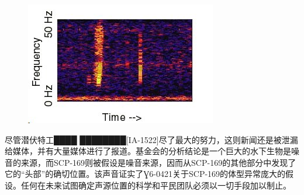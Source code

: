 \begin{figure}[H]
    \centering
    \includegraphics[width=0.5\linewidth]{images/SCP-169.jpg}
\end{figure}

尽管潜伏特工████ ████████{[}IA-1522]尽了最大的努力，这则新闻还是被泄漏给媒体，并有大量媒体进行了报道。基金会的分析结论是一个巨大的水下生物是噪音的来源，而SCP-169则被假设是噪音来源，因而从SCP-169的其他部分中发现了它的“头部”的确切位置。该声音证实了Ɣ6-0421关于SCP-169的体型异常庞大的假设。任何在未来试图确定声源位置的科学和平民团队必须以一切手段加以制止。
